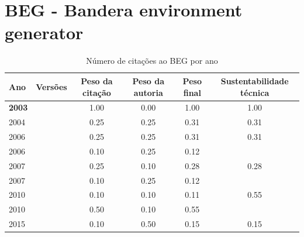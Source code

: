 \section{BEG - Bandera environment generator}


\begin{table}[H]
\caption{Número de citações ao BEG  por ano}
\centering
\begin{tabular}{| l | c | c | c | c | c |}
  \hline
  Ano & Versões & Peso da citação & Peso da autoria & Peso final & Sustentabilidade técnica \\
  \hline
            {\bf 2003}
          &
          
          &
          1.00
          &
          0.00
          &
          1.00
          &
            {\color{blue} 1.00}
          \\
\hline
            2004
          &
          
          &
          0.25
          &
          0.25
          &
          0.31
          &
            {\color{red} 0.31}
          \\
\hline
            2006
          &
          
          &
          0.25
          &
          0.25
          &
          0.31
          &
            {\color{red} 0.31}
          \\
            2006
          &
          
          &
          0.10
          &
          0.25
          &
          0.12
          &
          \\
\hline
            2007
          &
          
          &
          0.25
          &
          0.10
          &
          0.28
          &
            {\color{red} 0.28}
          \\
            2007
          &
          
          &
          0.10
          &
          0.25
          &
          0.12
          &
          \\
\hline
            2010
          &
          
          &
          0.10
          &
          0.10
          &
          0.11
          &
            {\color{blue} 0.55}
          \\
            2010
          &
          
          &
          0.50
          &
          0.10
          &
          0.55
          &
          \\
\hline
            2015
          &
          
          &
          0.10
          &
          0.50
          &
          0.15
          &
            {\color{red} 0.15}
          \\
\hline
\end{tabular}
\end{table}



